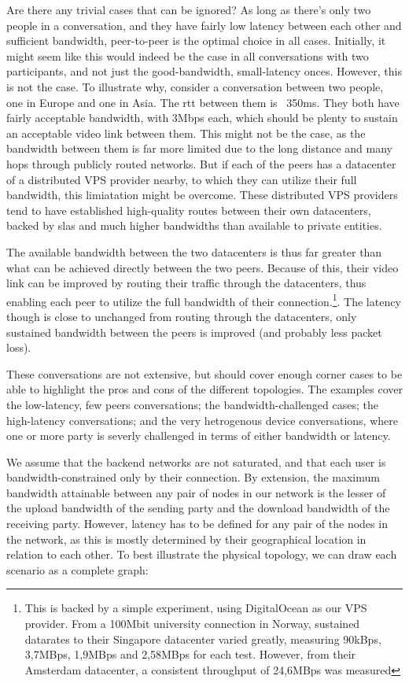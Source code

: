 Are there any trivial cases that can be ignored? As long as there's only two people in a conversation, and they have fairly low latency between each other and sufficient bandwidth, peer-to-peer is the optimal choice in all cases. Initially, it might seem like this would indeed be the case in all conversations with two participants, and not just the good-bandwidth, small-latency onces. However, this is not the case. To illustrate why, consider a conversation between two people, one in Europe and one in Asia. The \gls{rtt} between them is ~350ms. They both have fairly acceptable bandwidth, with 3Mbps each, which should be plenty to sustain an acceptable video link between them. This might not be the case, as the bandwidth between them is far more limited due to the long distance and many hops through publicly routed networks. But if each of the peers has a datacenter of a distributed VPS provider nearby, to which they can utilize their full bandwidth, this limiatation might be overcome. These distributed VPS providers tend to have established high-quality routes between their own datacenters, backed by \glspl{sla} and much higher bandwidths than available to private entities.

The available bandwidth between the two datacenters is thus far greater than what can be achieved directly between the two peers. Because of this, their video link can be improved by routing their traffic through the datacenters, thus enabling each peer to utilize the full bandwidth of their connection.\footnote{This is backed by a simple experiment, using DigitalOcean as our VPS provider. From a 100Mbit university connection in Norway, sustained datarates to their Singapore datacenter varied greatly, measuring 90kBps, 3,7MBps, 1,9MBps and 2,58MBps for each test. However, from their Amsterdam datacenter, a consistent throughput of 24,6MBps was measured}. The latency though is close to unchanged from routing through the datacenters, only sustained bandwidth between the peers is improved (and probably less packet loss).

These conversations are not extensive, but should cover enough corner cases to be able to highlight the pros and cons of the different topologies. The examples cover the low-latency, few peers conversations; the bandwidth-challenged cases; the high-latency conversations; and the very hetrogenous device conversations, where one or more party is severly challenged in terms of either bandwidth or latency.

We assume that the backend networks are not saturated, and that each user is bandwidth-constrained only by their connection. By extension, the maximum bandwidth attainable between any pair of nodes in our network is the lesser of the upload bandwidth of the sending party and the download bandwidth of the receiving party. However, latency has to be defined for any pair of the nodes in the network, as this is mostly determined by their geographical location in relation to each other. To best illustrate the physical topology, we can draw each scenario as a complete graph:

